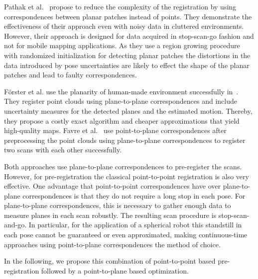 Pathak et al.~\cite{Pathak:2010} propose to reduce the complexity of the registration by using correspondences between planar patches instead of points.
They demonstrate the effectiveness of their approach even with noisy data in cluttered environments.
However, their approach is designed for data acquired in stop-scan-go fashion and not for mobile mapping applications.
As they use a region growing procedure with randomized initialization for detecting planar patches the distortions in the data introduced by pose uncertainties are likely to effect the shape of the planar patches and lead to faulty correspondences.

Förster et al. use the planarity of human-made environment successfully in~\cite{Foerstner2017}.
They register point clouds using plane-to-plane correspondences and include uncertainty measures for the detected planes and the estimated motion.
Thereby, they propose a costly exact algorithm and cheaper approximations that yield high-quality maps.
Favre et al.~\cite{favre2021} use point-to-plane correspondences after preprocessing the point clouds using plane-to-plane correspondences to register two scans with each other successfully.

Both approaches use plane-to-plane correspondences to pre-register the scans.
However, for pre-registration the classical point-to-point registration is also very effective. 
One advantage that point-to-point correspondences have over plane-to-plane correspondences is that they do not require a long stop in each pose.
For plane-to-plane correspondences, this is necessary to gather enough data to measure planes in each scan robustly.
The resulting scan procedure is stop-scan-and-go.
In particular, for the application of a spherical robot this standstill in each pose cannot be guaranteed or even approximated, making continuous-time approaches using point-to-plane correspondences the method of choice.

In the following, we propose this combination of point-to-point based pre-registration followed by a point-to-plane based optimization. 
